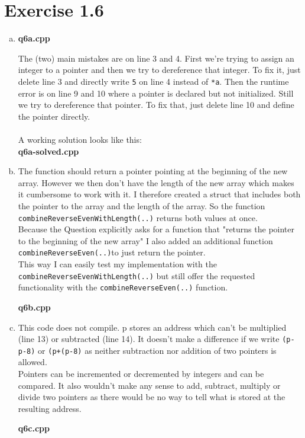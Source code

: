 \documentclass{article} %
\newcommand{\homeworkNumber}{1} %
\begin{document}
\section*{Exercise \homeworkNumber.6}
\begin{enumerate}[(a)]
\item
\textbf{q6a.cpp}
\lstset{language=C++}

The (two) main mistakes are on line 3 and 4. First we're trying to assign an integer to a pointer and then we try to dereference that integer. To fix it, just delete line 3 and directly write \verb|5| on line 4 instead of \verb|*a|.
Then the runtime error is on line 9 and 10 where a pointer is declared but not initialized. Still we try to dereference that pointer. To fix that, just delete line 10 and define the pointer directly.\\\\
A working solution looks like this:\\
\textbf{q6a-solved.cpp}
\lstset{language=C++}

\clearpage

\item
The function should return a pointer pointing at the beginning of the new array. However we then don't have the length of the new array which makes it cumbersome to work with it. I therefore created a struct that includes both the pointer to the array and the length of the array. So the function \verb|combineReverseEvenWithLength(..)| returns both values at once.\\
Because the Question explicitly asks for a function that "returns the pointer to the beginning of the new array" I also added an additional function \verb|combineReverseEven(..)|to just return the pointer.\\
This way I can easily test my implementation with the \verb|combineReverseEvenWithLength(..)| but still offer the requested functionality with the \verb|combineReverseEven(..)| function.

\textbf{q6b.cpp}
\lstset{language=C++}

\clearpage

\item
This code does not compile. p stores an address which can't be multiplied (line 13) or subtracted (line 14).
It doesn't make a difference if we write \verb|(p-p-8)| or \verb|(p+(p-8)| as neither subtraction nor addition of two pointers is allowed.\\
Pointers can be incremented or decremented by integers and can be compared. It also wouldn't make any sense to add, subtract, multiply or divide two pointers as there would be no way to tell what is stored at the resulting address.

\textbf{q6c.cpp}
\lstset{language=C++}

\clearpage

\end{enumerate}
\end{document}
